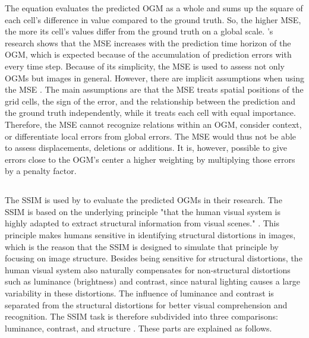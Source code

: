 The equation evaluates the predicted \gls{OGM} as a whole and sums up the square of each cell's difference in value compared to the ground truth. So, the higher \gls{MSE}, the more its cell's values differ from the ground truth on a global scale. \cite{toyungyernsub2020double}'s research shows that the \gls{MSE} increases with the prediction time horizon of the \gls{OGM}, which is expected because of the accumulation of prediction errors with every time step. Because of its simplicity, the \gls{MSE} is used to assess not only \glspl{OGM} but images in general. However, there are implicit assumptions when using the \gls{MSE} \cite{wang2009mean}. The main assumptions are that the \gls{MSE} treats spatial positions of the grid cells, the sign of the error, and the relationship between the prediction and the ground truth independently, while it treats each cell with equal importance. Therefore, the \gls{MSE} cannot recognize relations within an \gls{OGM}, consider context, or differentiate local errors from global errors. The \gls{MSE} would thus not be able to assess displacements, deletions or additions. It is, however, possible to give errors close to the \gls{OGM}'s center a higher weighting by multiplying those errors by a penalty factor.    

\subsection{} \label{subsec:ssim_met}
The \gls{SSIM} is used by \cite{mohajerin2019multi} to evaluate the predicted \glspl{OGM} in their research. The \gls{SSIM} is based on the underlying principle "that the human visual system is highly adapted to extract structural information from visual scenes." \cite{wang2009mean}. This principle makes humans sensitive in identifying structural distortions in images, which is the reason that the \gls{SSIM} is designed to simulate that principle by focusing on image structure. Besides being sensitive for structural distortions, the human visual system also naturally compensates for non-structural distortions such as luminance (brightness) and contrast, since natural lighting causes a large variability in these distortions. The influence of luminance and contrast is separated from the structural distortions for better visual comprehension and recognition. The \gls{SSIM} task is therefore subdivided into three comparisons: luminance, contrast, and structure \cite{wang2004image}. These parts are explained as follows.\\

